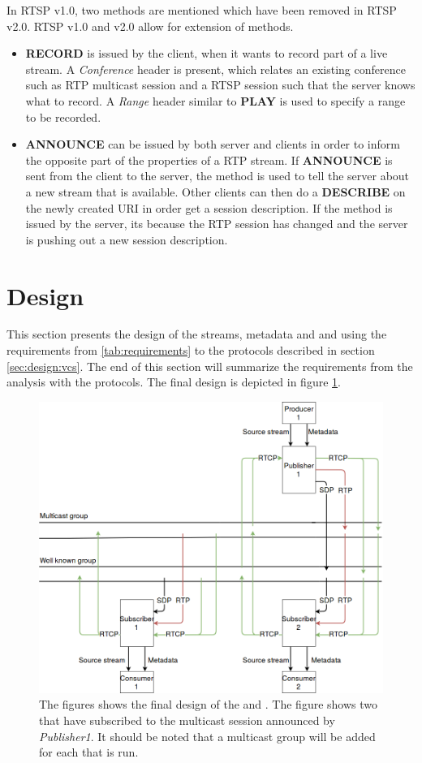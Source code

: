 In RTSP v1.0\citep{RFC2326}, two methods are mentioned which have been removed in RTSP v2.0. RTSP v1.0 and v2.0 allow for extension of methods.
\begin{itemize}
	\item \textbf{RECORD} is issued by the client, when it wants to record part of a live stream. A \textit{Conference} header is present, which relates an existing conference such as RTP multicast session and a RTSP session such that the server knows what to record. A \textit{Range} header similar to \textbf{PLAY} is used to specify a range to be recorded.
	\item \textbf{ANNOUNCE} can be issued by both server and clients in order to inform the opposite part of the properties of a RTP stream. If \textbf{ANNOUNCE} is sent from the client to the server, the method is used to tell the server about a new stream that is available. Other clients can then do a \textbf{DESCRIBE} on the newly created URI in order get a session description. If the method is issued by the server, its because the RTP session has changed and the server is pushing out a new session description.
\end{itemize}


\section{Design}
This section presents the design of the streams, metadata  and  and  using the requirements from \ref{tab:requirements} to the protocols described in section \ref{sec:design:vcs}. The end of this section will summarize the requirements from the analysis with the protocols.
The final design is depicted in figure \ref{fig:design:overall}.
\begin{figure}[H]
	\centering
	\includegraphics[width=\textwidth]{figures/design_overall.png}
	\caption{The figures shows the final design of the \pubs{} and \subs{}. The figure shows two \pubs{} that have subscribed to the multicast session announced by \textit{Publisher1}. It should be noted that a multicast group will be added for each \pub{} that is run.} \label{fig:design:overall}
\end{figure}

